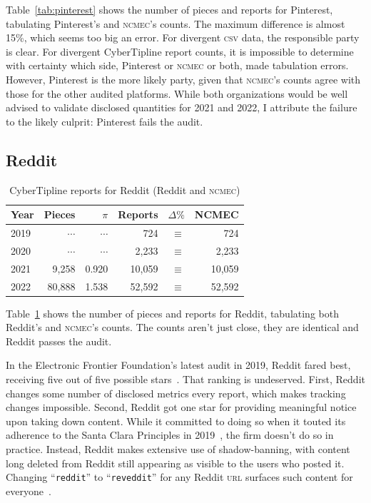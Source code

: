 \documentclass[nonacm,screen]{acmart}
\newcommand\V[1]{\textsc{\MakeLowercase{#1}}}
\begin{document}
\noindent{}Table~\ref{tab:pinterest} shows the number of pieces and reports for
Pinterest, tabulating Pinterest's and \V{NCMEC}'s counts. The maximum difference
is almost 15\%, which seems too big an error. For divergent \V{CSV} data, the
responsible party is clear. For divergent CyberTipline report counts, it is
impossible to determine with certainty which side, Pinterest or \V{NCMEC} or
both, made tabulation errors. However, Pinterest is the more likely party, given
that \V{NCMEC}'s counts agree with those for the other audited platforms. While
both organizations would be well advised to validate disclosed quantities for
2021 and 2022, I attribute the failure to the likely culprit: Pinterest fails
the audit.


\subsection{Reddit}

\begin{table}[h!]
\centering\libertineLF
\caption{CyberTipline reports for Reddit (Reddit and \V{NCMEC})}
\label{tab:reddit}
\begin{tabular}{l|rr|rrr}
\textbf{Year}
& \textbf{Pieces} & \textbf{$\pi$} & \textbf{Reports}
& \textbf{$\Delta\%$} & \textbf{NCMEC} \\ \hline
2019 & $\cdots$ & $\cdots$ & 724 & $\equiv$ & 724 \\
2020 & $\cdots$ & $\cdots$ & 2,233 & $\equiv$ & 2,233 \\
2021 & 9,258 & 0.920 & 10,059 & $\equiv$ & 10,059 \\
2022 & 80,888 & 1.538 & 52,592 & $\equiv$ & 52,592 \\
\end{tabular}
\end{table}

\noindent{}Table~\ref{tab:reddit} shows the number of pieces and reports for
Reddit, tabulating both Reddit's and \V{NCMEC}'s counts. The counts aren't just
close, they are identical and Reddit passes the audit.

In the Electronic Frontier Foundation's latest audit in 2019, Reddit fared best,
receiving five out of five possible stars~\cite{CrockerGebhartea2019}. That
ranking is undeserved. First, Reddit changes some number of disclosed metrics
every report, which makes tracking changes impossible. Second, Reddit got one
star for providing meaningful notice upon taking down content. While it
committed to doing so when it touted its adherence to the Santa Clara Principles
in 2019~\cite{Reddit2022}, the firm doesn't do so in practice. Instead, Reddit
makes extensive use of shadow-banning, with content long deleted from Reddit
still appearing as visible to the users who posted it. Changing
``\texttt{reddit}'' to ``\texttt{reveddit}'' for any Reddit \V{URL} surfaces
such content for everyone~\cite{Hawkins2023}.
\end{document}
